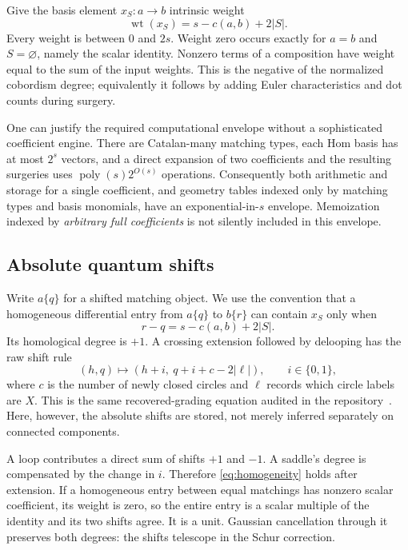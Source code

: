 \documentclass[11pt,letterpaper]{article}
\theoremstyle{remark}\newtheorem{remark}[theorem]{Remark}
\newcommand{\wt}{\operatorname{wt}}
\newcommand{\poly}{\operatorname{poly}}
\begin{document}
Give the basis element $x_S:a\to b$ intrinsic weight
\begin{equation}\label{eq:weight}
 \wt(x_S)=s-c(a,b)+2|S|.
\end{equation}
Every weight is between $0$ and $2s$. Weight zero occurs exactly for $a=b$ and $S=\varnothing$, namely the scalar identity. Nonzero terms of a composition have weight equal to the sum of the input weights. This is the negative of the normalized cobordism degree; equivalently it follows by adding Euler characteristics and dot counts during surgery.

One can justify the required computational envelope without a sophisticated coefficient engine. There are Catalan-many matching types, each Hom basis has at most $2^s$ vectors, and a direct expansion of two coefficients and the resulting surgeries uses $\poly(s)2^{O(s)}$ operations. Consequently both arithmetic and storage for a single coefficient, and geometry tables indexed only by matching types and basis monomials, have an exponential-in-$s$ envelope. Memoization indexed by \emph{arbitrary full coefficients} is not silently included in this envelope.

\subsection{Absolute quantum shifts}
Write $a\{q\}$ for a shifted matching object. We use the convention that a homogeneous differential entry from $a\{q\}$ to $b\{r\}$ can contain $x_S$ only when
\begin{equation}\label{eq:homogeneity}
 r-q=s-c(a,b)+2|S|.
\end{equation}
Its homological degree is $+1$. A crossing extension followed by delooping has the raw shift rule
\begin{equation}\label{eq:child}
 (h,q)\longmapsto \left(h+i,\ q+i+c-2|\ell|\right),
 \qquad i\in\{0,1\},
\end{equation}
where $c$ is the number of newly closed circles and $\ell$ records which circle labels are $X$. This is the same recovered-grading equation audited in the repository~\cite{Repo}. Here, however, the absolute shifts are stored, not merely inferred separately on connected components.

A loop contributes a direct sum of shifts $+1$ and $-1$. A saddle's degree is compensated by the change in $i$. Therefore \eqref{eq:homogeneity} holds after extension. If a homogeneous entry between equal matchings has nonzero scalar coefficient, its weight is zero, so the entire entry is a scalar multiple of the identity and its two shifts agree. It is a unit. Gaussian cancellation through it preserves both degrees: the shifts telescope in the Schur correction.
\end{document}
